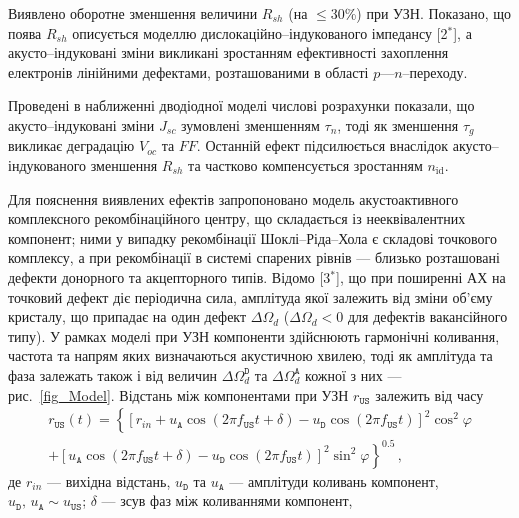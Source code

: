 Виявлено оборотне зменшення величини
$R_{sh}$
(на $\leq$30\%) при УЗН.
Показано, що поява $R_{sh}$ описується моделлю дислокаційно--індукованого імпедансу
[2$^*$], а акусто--індуковані зміни викликані зростанням ефективності захоплення електронів лінійними дефектами, розташованими в області $p$---$n$--переходу.

Проведені в наближенні дводіодної моделі числові розрахунки показали, що акусто--індуковані зміни $J_{sc}$ зумовлені зменшенням $\tau_{n}$,
тоді як зменшення $\tau_{g}$ викликає деградацію $V_{oc}$ та $F\!F$.
Останній ефект підсилюється внаслідок акусто--індукованого зменшення $R_{sh}$ та частково компенсується зростанням $n_\mathrm{id}$.

Для пояснення виявлених ефектів запропоновано модель акустоактивного комплексного рекомбінаційного центру, що складається із нееквівалентних компонент;
ними у випадку рекомбінації Шоклі--Ріда--Хола є складові точкового комплексу, а
при рекомбінації в системі спарених рівнів --- близько розташовані дефекти донорного та акцепторного типів.
Відомо
[3$^*$], що
при поширенні АХ на точковий дефект діє періодична сила, амплітуда якої залежить від зміни об'єму кристалу, що припадає на один дефект $\Delta\Omega_d$
($\Delta\Omega_d<0$ для дефектів вакансійного типу).
У рамках моделі при УЗН компоненти
здійснюють гармонічні коливання, частота та напрям яких
визначаються акустичною хвилею, тоді як амплітуда та фаза залежать також і від  величин $\Delta\Omega_d^\mathtt{D}$ та
$\Delta\Omega_d^\mathtt{A}$ кожної з них --- рис.~\ref{fig_Model}.
Відстань між компонентами при УЗН $r_\mathtt{US}$ залежить від часу
\begin{multline}
\label{eqrUS}
r_\mathtt{US}(t)=\left\{[r_{in}+u_\mathtt{A}\cos(2\pi f_\mathtt{US}t+\delta)-u_\mathtt{D}\cos(2\pi f_\mathtt{US}t)]^2\cos^2\varphi \right.\\
    \left.+ [u_\mathtt{A}\cos(2\pi f_\mathtt{US}t+\delta)-u_\mathtt{D}\cos(2\pi f_\mathtt{US}t)]^2\sin^2\varphi\right\}^{0.5}\,,
\end{multline}
де
$r_{in}$ --- вихідна відстань,
$u_\mathtt{D}$ та $u_\mathtt{A}$ --- амплітуди коливань компонент, $u_\mathtt{D},\,u_\mathtt{A}\sim u_\mathtt{US}$;
$\delta$ --- зсув фаз між коливаннями компонент,
